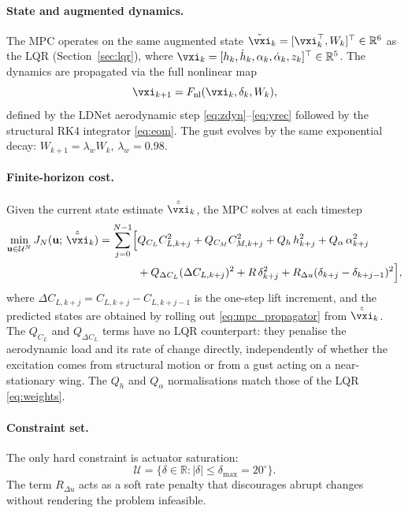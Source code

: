 \paragraph{State and augmented dynamics.}
The MPC operates on the same augmented state
$\tilde{\vxi}_k = [\vxi_k^\top, W_k]^\top \in \mathbb{R}^6$
as the LQR (Section~\ref{sec:lqr}), where
$\vxi_k = [h_k, \dot{h}_k, \alpha_k, \dot{\alpha}_k, z_k]^\top \in \mathbb{R}^5$.
The dynamics are propagated via the full nonlinear map
\begin{equation}
  \vxi_{k+1} = F_{\rm nl}(\vxi_k, \delta_k, W_k),
  \label{eq:mpc_propagator}
\end{equation}
defined by the LDNet aerodynamic step \eqref{eq:zdyn}--\eqref{eq:yrec}
followed by the structural RK4 integrator \eqref{eq:eom}.
The gust evolves by the same exponential decay:
$W_{k+1} = \lambda_w W_k$, $\lambda_w = 0.98$.

\paragraph{Finite-horizon cost.}
Given the current state estimate $\hat{\tilde{\vxi}}_k$, the MPC solves at
each timestep
\begin{equation}
  \begin{split}
    \min_{\mathbf{u} \in \mathcal{U}^N} J_N(\mathbf{u};\,\hat{\tilde{\vxi}}_k)
    = \sum_{j=0}^{N-1} \Bigl[
      & Q_{C_L} C_{L,k+j}^2 + Q_{C_M} C_{M,k+j}^2
        + Q_h\, h_{k+j}^2 + Q_\alpha\, \alpha_{k+j}^2 \\
      & + Q_{\Delta C_L}(\Delta C_{L,k+j})^2
        + R\,\delta_{k+j}^2 + R_{\Delta u}(\delta_{k+j} - \delta_{k+j-1})^2
    \Bigr],
  \end{split}
  \label{eq:mpc_cost}
\end{equation}
where $\Delta C_{L,k+j} = C_{L,k+j} - C_{L,k+j-1}$ is the one-step lift
increment, and the predicted states are obtained by rolling out
\eqref{eq:mpc_propagator} from $\hat{\tilde{\vxi}}_k$.
The $Q_{C_L}$ and $Q_{\Delta C_L}$ terms have no LQR counterpart: they
penalise the aerodynamic load and its rate of change directly, independently
of whether the excitation comes from structural motion or from a gust acting
on a near-stationary wing.
The $Q_h$ and $Q_\alpha$ normalisations match those of the LQR
\eqref{eq:weights}.

\paragraph{Constraint set.}
The only hard constraint is actuator saturation:
\begin{equation}
  \mathcal{U} = \{\delta \in \mathbb{R} : |\delta| \le \delta_{\max} = 20^\circ\}.
  \label{eq:box}
\end{equation}
The term $R_{\Delta u}$ acts as a soft rate penalty that discourages abrupt
changes without rendering the problem infeasible.

